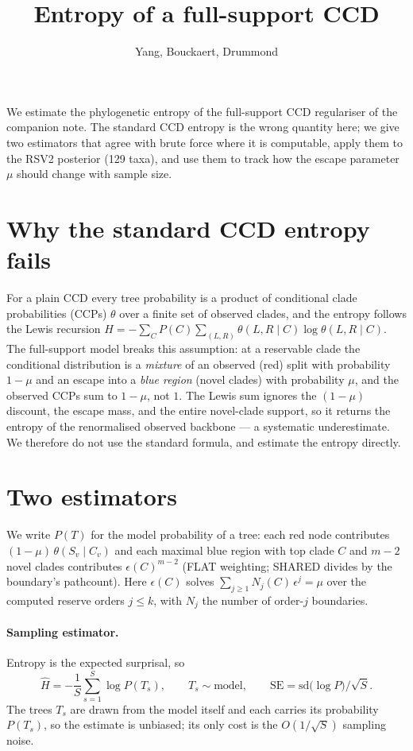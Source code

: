 \documentclass{article}
\newcommand{\eps}{\epsilon}
\begin{document}
\title{Entropy of a full-support CCD}
\author{Yang, Bouckaert, Drummond}
\date{}
\maketitle

\noindent
We estimate the phylogenetic entropy of the full-support CCD regulariser of the
companion note. The standard CCD entropy is the wrong quantity here; we give two
estimators that agree with brute force where it is computable, apply them to the
RSV2 posterior (129 taxa), and use them to track how the escape parameter $\mu$
should change with sample size.

\section*{Why the standard CCD entropy fails}

For a plain CCD every tree probability is a product of conditional clade
probabilities (CCPs) $\theta$ over a finite set of observed clades, and the
entropy follows the Lewis recursion
$H=-\sum_C P(C)\sum_{(L,R)}\theta(L,R\mid C)\log\theta(L,R\mid C)$.
The full-support model breaks this assumption: at a reservable clade the
conditional distribution is a \emph{mixture} of an observed (red) split with
probability $1-\mu$ and an escape into a \emph{blue region} (novel clades) with
probability $\mu$, and the observed CCPs sum to $1-\mu$, not $1$. The Lewis sum
ignores the $(1-\mu)$ discount, the escape mass, and the entire novel-clade
support, so it returns the entropy of the renormalised observed backbone --- a
systematic underestimate. We therefore do not use the standard formula, and
estimate the entropy directly.

\section*{Two estimators}

We write $P(T)$ for the model probability of a tree: each red node contributes
$(1-\mu)\,\theta(S_v\mid C_v)$ and each maximal blue region with top clade $C$ and
$m-2$ novel clades contributes $\eps(C)^{m-2}$ (FLAT weighting; SHARED divides by
the boundary's pathcount). Here $\eps(C)$ solves
$\sum_{j\ge1}N_j(C)\,\eps^{j}=\mu$ over the computed reserve orders $j\le k$, with
$N_j$ the number of order-$j$ boundaries.

\paragraph{Sampling estimator.}
Entropy is the expected surprisal, so
\begin{equation}
  \hat H = -\frac{1}{S}\sum_{s=1}^{S}\log P(T_s),\qquad T_s\sim\text{model},
  \qquad \mathrm{SE}=\mathrm{sd}\!\big(\log P\big)\big/\sqrt{S}.
\end{equation}
The trees $T_s$ are drawn from the model itself and each carries its probability
$P(T_s)$, so the estimate is unbiased; its only cost is the $O(1/\sqrt{S})$
sampling noise.
\end{document}
